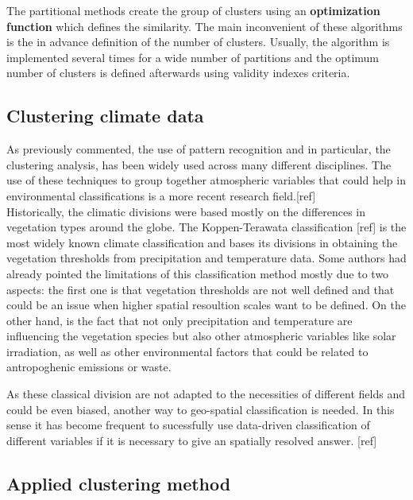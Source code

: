 The partitional methods create the group of clusters using an \textbf{optimization function} which defines the similarity. The main inconvenient of these algorithms is the in advance definition of the number of clusters. Usually, the algorithm is implemented several times for a wide number of partitions and the optimum number of clusters is defined afterwards using validity indexes criteria.\\

{\color{red}{Añadir algo más sobre algoritmos partitional}}


\subsection{Clustering climate data}

As previously commented, the use of pattern recognition and in particular, the clustering analysis, has been widely used across many different disciplines. The use of these techniques to group together atmospheric variables that could help in environmental classifications is a more recent research field.[ref]\\

Historically, the climatic divisions were based mostly on the differences in vegetation types around the globe. The Koppen-Terawata classification [ref] is the most widely known climate classification and bases its divisions in obtaining the vegetation thresholds from precipitation and temperature data. Some authors had already pointed the limitations of this classification method mostly due to two aspects: the first one is that vegetation thresholds are not well defined and that could be an issue when higher spatial resoultion scales want to be defined. On the other hand, is the fact that not only precipitation and temperature are influencing the vegetation species but also other atmospheric variables like solar irradiation, as well as other environmental factors that could be related to antropoghenic emissions or waste.\\

{\color{red}{Buscar más biblio de esto}}

As these classical division are not adapted to the necessities of different fields and could be even biased, another way to geo-spatial classification is needed. In this sense it has become frequent to sucessfully use data-driven classification of different variables if it is necessary to give an spatially resolved answer. [ref]

\subsection{Applied clustering method}

